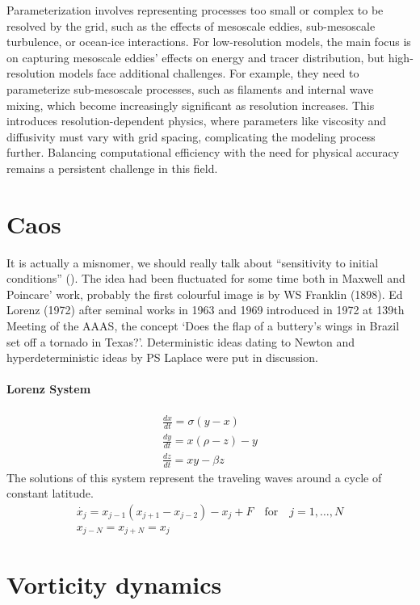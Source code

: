 Parameterization involves representing processes too small or complex to be resolved by the grid, such as the effects of mesoscale eddies, sub-mesoscale turbulence, or ocean-ice interactions. For low-resolution models, the main focus is on capturing mesoscale eddies' effects on energy and tracer distribution, but high-resolution models face additional challenges. For example, they need to parameterize sub-mesoscale processes, such as filaments and internal wave mixing, which become increasingly significant as resolution increases. This introduces resolution-dependent physics, where parameters like viscosity and diffusivity must vary with grid spacing, complicating the modeling process further. Balancing computational efficiency with the need for physical accuracy remains a persistent challenge in this field.

\section{Caos}
It is actually a misnomer, we should really talk about
“sensitivity to initial conditions” (\cite{chaosbook}). The idea had been fluctuated for some time both in
Maxwell and Poincare’ work, probably the first
colourful image is by WS Franklin (1898). Ed Lorenz (1972) after seminal works in 1963 and 1969 introduced in 1972 at 139th Meeting of the AAAS, the concept ‘Does the flap of a buttery’s wings in Brazil set off a tornado in Texas?’.
Deterministic ideas dating to Newton and hyperdeterministic ideas by PS Laplace were put in discussion.
\paragraph{Lorenz System}
\begin{align}\label{eq.lorenz system}
	\frac{dx}{dt}=\sigma(y-x) \\
	\frac{dy}{dt}=x(\rho-z)-y \\
	\frac{dz}{dt}=xy-\beta z
\end{align}
The solutions of this system represent the traveling waves around a cycle of constant latitude.
\begin{align*}
	\dot{x_j}=x_{j-1}(x_{j+1}-x_{j-2})-x_j+F \quad \text{for} \quad j=1,\dots,N \\
	x_{j-N}=x_{j+N}=x_j
\end{align*}
\section{Vorticity dynamics}
